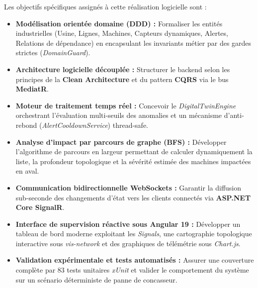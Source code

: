 Les objectifs spécifiques assignés à cette réalisation logicielle sont :
\begin{itemize}
    \item \textbf{Modélisation orientée domaine (DDD) :} Formaliser les entités industrielles (Usine, Lignes, Machines, Capteurs dynamiques, Alertes, Relations de dépendance) en encapsulant les invariants métier par des gardes strictes (\textit{DomainGuard}).
    \item \textbf{Architecture logicielle découplée :} Structurer le backend selon les principes de la \textbf{Clean Architecture} et du pattern \textbf{CQRS} via le bus \textbf{MediatR}.
    \item \textbf{Moteur de traitement temps réel :} Concevoir le \textit{DigitalTwinEngine} orchestrant l'évaluation multi-seuils des anomalies et un mécanisme d'anti-rebond (\textit{AlertCooldownService}) thread-safe.
    \item \textbf{Analyse d'impact par parcours de graphe (BFS) :} Développer l'algorithme de parcours en largeur permettant de calculer dynamiquement la liste, la profondeur topologique et la sévérité estimée des machines impactées en aval.
    \item \textbf{Communication bidirectionnelle WebSockets :} Garantir la diffusion sub-seconde des changements d'état vers les clients connectés via \textbf{ASP.NET Core SignalR}.
    \item \textbf{Interface de supervision réactive sous Angular 19 :} Développer un tableau de bord moderne exploitant les \textit{Signals}, une cartographie topologique interactive sous \textit{vis-network} et des graphiques de télémétrie sous \textit{Chart.js}.
    \item \textbf{Validation expérimentale et tests automatisés :} Assurer une couverture complète par 83 tests unitaires \textit{xUnit} et valider le comportement du système sur un scénario déterministe de panne de concasseur.
\end{itemize}


